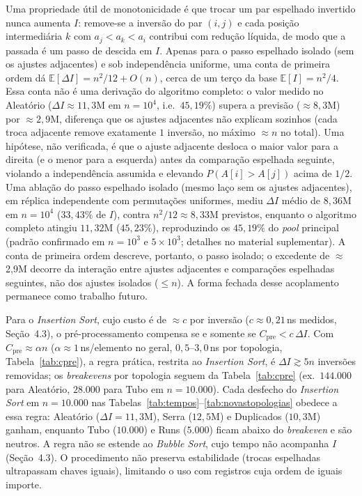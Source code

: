 \documentclass[portuguese]{sbc2025}%
\begin{document}
Uma propriedade útil de monotonicidade é que trocar um par espelhado invertido nunca aumenta $I$: remove-se a inversão do par $(i,j)$ e cada posição intermediária $k$ com $a_j<a_k<a_i$ contribui com redução líquida, de modo que a passada é um passo de descida em $I$. Apenas para o passo espelhado isolado (sem os ajustes adjacentes) e sob independência uniforme, uma conta de primeira ordem dá $\mathbb{E}[\Delta I]=n^2/12+O(n)$, cerca de um terço da base $\mathbb{E}[I]=n^2/4$. Essa conta não é uma derivação do algoritmo completo: o valor medido no Aleatório ($\Delta I \approx 11{,}3$M em $n{=}10^4$, i.e.\ $45{,}19\%$) supera a previsão ($\approx 8{,}3$M) por $\approx 2{,}9$M, diferença que os ajustes adjacentes não explicam sozinhos (cada troca adjacente remove exatamente $1$ inversão, no máximo $\approx n$ no total). Uma hipótese, não verificada, é que o ajuste adjacente desloca o maior valor para a direita (e o menor para a esquerda) antes da comparação espelhada seguinte, violando a independência assumida e elevando $P(A[i] > A[j])$ acima de $1/2$. Uma ablação do passo espelhado isolado (mesmo laço sem os ajustes adjacentes), em réplica independente com permutações uniformes, mediu $\Delta I$ médio de $8{,}36$M em $n{=}10^4$ ($33{,}43\%$ de $I$), contra $n^2/12 \approx 8{,}33$M previstos, enquanto o algoritmo completo atingiu $11{,}32$M ($45{,}23\%$), reproduzindo os $45{,}19\%$ do \emph{pool} principal (padrão confirmado em $n{=}10^3$ e $5{\times}10^3$; detalhes no material suplementar). A conta de primeira ordem descreve, portanto, o passo isolado; o excedente de $\approx$2{,}9M decorre da interação entre ajustes adjacentes e comparações espelhadas seguintes, não dos ajustes isolados ($\le n$). A forma fechada desse acoplamento permanece como trabalho futuro.

Para o \emph{Insertion Sort}, cujo custo é de $\approx c$ por inversão ($c\approx0{,}21$\,ns medidos, Seção~4.3), o pré-processamento compensa se e somente se $C_{\text{pre}} < c\,\Delta I$. Com $C_{\text{pre}}\approx\alpha n$ ($\alpha\approx1$\,ns/elemento no geral, $0{,}5$--$3{,}0$\,ns por topologia, Tabela~\ref{tab:cpre}), a regra prática, restrita ao \emph{Insertion Sort}, é $\Delta I \gtrsim 5n$ inversões removidas; os \emph{breakevens} por topologia seguem da Tabela~\ref{tab:cpre} (ex.\ $144.000$ para Aleatório, $28.000$ para Tubo em $n{=}10.000$). Cada desfecho do \emph{Insertion Sort} em $n{=}10.000$ nas Tabelas~\ref{tab:tempos}--\ref{tab:novastopologias} obedece a essa regra: Aleatório ($\Delta I{=}11{,}3$M), Serra ($12{,}5$M) e Duplicados ($10{,}3$M) ganham, enquanto Tubo ($10.000$) e Runs ($5.000$) ficam abaixo do \emph{breakeven} e são neutros. A regra não se estende ao \emph{Bubble Sort}, cujo tempo não acompanha $I$ (Seção~4.3). O procedimento não preserva estabilidade (trocas espelhadas ultrapassam chaves iguais), limitando o uso com registros cuja ordem de iguais importe.
\end{document}

